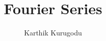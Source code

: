 \documentclass[journal,12pt,twocolumn]{IEEEtran}
\begin{document}
\newcommand{\solution}{\noindent \textbf{Solution: }}
\providecommand{\dec}[2]{\ensuremath{\overset{#1}{\underset{#2}{\gtrless}}}}
\makeatletter
{}
\makeatother
\let\StandardTheFigure\thefigure
\renewcommand{\thefigure}{\theproblem}
\def\putbox#1#2#3{\makebox[0in][l]{\makebox[#1][l]{}\raisebox{\baselineskip}[0in][0in]{\raisebox{#2}[0in][0in]{#3}}}}
\def\rightbox#1{\makebox[0in][r]{#1}}
\def\centbox#1{\makebox[0in]{#1}}
\def\topbox#1{\raisebox{-\baselineskip}[0in][0in]{#1}}
\def\midbox#1{\raisebox{-0.5\baselineskip}[0in][0in]{#1}}
\vspace{3cm}
\title{
Fourier Series
}
%
%
%
\author{ Karthik Kurugodu
}
% 
%
\end{document}
